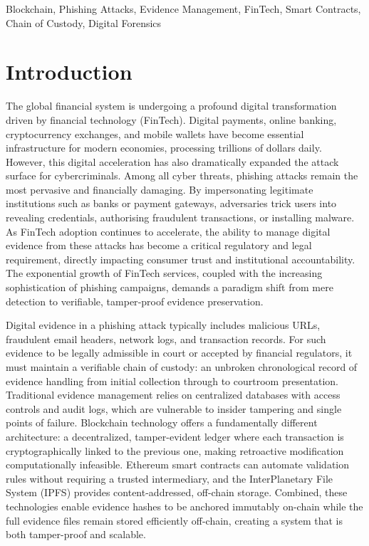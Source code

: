 \documentclass[conference]{IEEEtran}
\begin{document}
\begin{IEEEkeywords}
Blockchain, Phishing Attacks, Evidence Management, FinTech, Smart Contracts, Chain of Custody, Digital Forensics
\end{IEEEkeywords}

\section{Introduction}

The global financial system is undergoing a profound digital transformation driven by financial technology (FinTech). Digital payments, online banking, cryptocurrency exchanges, and mobile wallets have become essential infrastructure for modern economies, processing trillions of dollars daily. However, this digital acceleration has also dramatically expanded the attack surface for cybercriminals. Among all cyber threats, phishing attacks remain the most pervasive and financially damaging. By impersonating legitimate institutions such as banks or payment gateways, adversaries trick users into revealing credentials, authorising fraudulent transactions, or installing malware. As FinTech adoption continues to accelerate, the ability to manage digital evidence from these attacks has become a critical regulatory and legal requirement, directly impacting consumer trust and institutional accountability. The exponential growth of FinTech services, coupled with the increasing sophistication of phishing campaigns, demands a paradigm shift from mere detection to verifiable, tamper‑proof evidence preservation.

Digital evidence in a phishing attack typically includes malicious URLs, fraudulent email headers, network logs, and transaction records. For such evidence to be legally admissible in court or accepted by financial regulators, it must maintain a verifiable chain of custody: an unbroken chronological record of evidence handling from initial collection through to courtroom presentation. Traditional evidence management relies on centralized databases with access controls and audit logs, which are vulnerable to insider tampering and single points of failure. Blockchain technology offers a fundamentally different architecture: a decentralized, tamper-evident ledger where each transaction is cryptographically linked to the previous one, making retroactive modification computationally infeasible. Ethereum smart contracts can automate validation rules without requiring a trusted intermediary, and the InterPlanetary File System (IPFS) provides content-addressed, off-chain storage. Combined, these technologies enable evidence hashes to be anchored immutably on-chain while the full evidence files remain stored efficiently off-chain, creating a system that is both tamper-proof and scalable.
\end{document}
